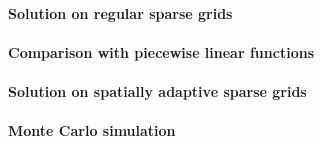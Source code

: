 \paragraph{Solution on regular sparse grids}

\dummytext[6]{}

\paragraph{Comparison with piecewise linear functions}

\dummytext[6]{}

\paragraph{Solution on spatially adaptive sparse grids}

\dummytext[6]{}

\paragraph{Monte Carlo simulation}


\dummytext[6]{}
